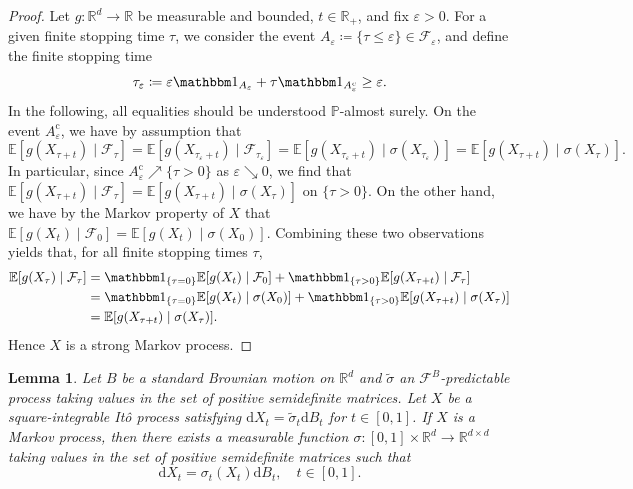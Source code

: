 \documentclass[12pt,oneside]{amsart}
\newtheorem{lemma}[theorem]{Lemma}
\theoremstyle{definition}
\newcommand{\F}{\mathcal F}
\newcommand{\D}{\mathrm{d}}
\newcommand{\R}{\mathbb R}
\def\P{{\mathbb P}}
\def\E{{\mathbb E}}
\def\R{{\mathbb R}}
\numberwithin{equation}{section}
\begin{document}
\begin{proof}
    Let $g \colon \R^d \to \R$ be measurable and bounded, $t \in \R_+$, and fix $\varepsilon > 0$.
    For a given finite stopping time $\tau$, 
    we consider the event $A_\varepsilon \coloneqq \{ \tau \le \varepsilon \} \in \F_\varepsilon$, and define the finite stopping time
    \begin{equation}
        \tau_\varepsilon \coloneqq \varepsilon \mathbbm 1_{A_\varepsilon} + \tau \mathbbm 1_{A_\varepsilon^\textrm{c}} \geq \varepsilon.
    \end{equation}
    In the following, all equalities should be understood $\P$-almost surely. On the event $A_\varepsilon^\textrm{c}$, we have by assumption that
    \begin{equation}
        \E[g(X_{\tau + t}) \mid \F_{\tau}] = \E[ g(X_{\tau_\varepsilon + t}) \mid \F_{\tau_\varepsilon}] = \E[g(X_{\tau_\varepsilon + t}) \mid \sigma(X_{\tau_\varepsilon})] = \E[g(X_{\tau + t}) \mid \sigma(X_{\tau})].
    \end{equation}
    In particular, since $A^\textrm{c}_\varepsilon \nearrow \{ \tau > 0 \}$ as $\varepsilon \searrow 0$, we find that
    	$\E[ g(X_{\tau + t}) \mid \F_{\tau}] = \E[ g(X_{\tau + t}) \mid \sigma(X_{\tau})]$ on $\{ \tau > 0 \}$.
    On the other hand, we have by the Markov property of $X$ that $\E[g(X_t) \mid \F_0] = \E[g(X_t) \mid \sigma(X_0)]$.
    Combining these two observations yields that, for all finite stopping times $\tau$,
    \begin{align}
        \E[g(X_\tau) \mid \F_\tau] & = \mathbbm 1_{\{ \tau = 0 \}} \E[g(X_t) \mid \F_0] + \mathbbm 1_{\{ \tau > 0 \}} \E[g(X_{\tau + t}) \mid \F_\tau]\\
        & =  \mathbbm 1_{\{ \tau = 0 \}} \E[g(X_t) \mid \sigma(X_0)] + \mathbbm 1_{\{ \tau > 0 \}} \E[g(X_{\tau + t}) \mid \sigma(X_\tau)]\\
        & = \E[ g(X_{\tau + t}) \mid \sigma(X_{\tau})].      
    \end{align}
    Hence $X$ is a strong Markov process.
\end{proof}

\begin{lemma}\label{lem:markov-diffusion}
	Let $B$ be a standard Brownian motion on $\R^d$ and $\tilde \sigma$ an $\F^B$-predictable process taking values in the set of positive semidefinite matrices. Let $X$ be a square-integrable It\^o process satisfying $\D X_t = \tilde \sigma_t \D B_t$ for $t \in [0, 1]$. If $X$ is a Markov process, then there exists a measurable function $\sigma \colon [0, 1] \times \R^d \to \R^{d \times d}$ taking values in the set of positive semidefinite matrices such that
	\begin{equation}\label{eq:markov-ito}
		\D X_t = \sigma_t(X_t) \D B_t, \quad t \in [0, 1].
	\end{equation}
\end{lemma}
\end{document}
